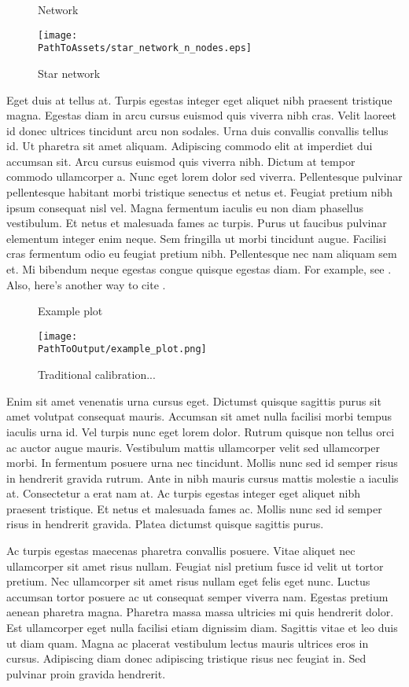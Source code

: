 \begin{figure}
\centering
\captionsetup{width=0.8\textwidth}
\caption{Network}
  \centering
  \texttt{[image: \\PathToAssets/star\_network\_n\_nodes.eps]}
\caption*{
  Star network
  }
\label{fig:star_network_n_nodes.eps}
\end{figure}


Eget duis at tellus at. Turpis egestas integer eget aliquet nibh praesent
tristique magna. Egestas diam in arcu cursus euismod quis viverra nibh cras.
Velit laoreet id donec ultrices tincidunt arcu non sodales. Urna duis
convallis convallis tellus id. Ut pharetra sit amet aliquam. Adipiscing
commodo elit at imperdiet dui accumsan sit. Arcu cursus euismod quis viverra
nibh. Dictum at tempor commodo ullamcorper a. Nunc eget lorem dolor sed
viverra. Pellentesque pulvinar pellentesque habitant morbi tristique senectus
et netus et. Feugiat pretium nibh ipsum consequat nisl vel. Magna fermentum
iaculis eu non diam phasellus vestibulum. Et netus et malesuada fames ac
turpis. Purus ut faucibus pulvinar elementum integer enim neque. Sem
fringilla ut morbi tincidunt augue. Facilisi cras fermentum odio eu feugiat
pretium nibh. Pellentesque nec nam aliquam sem et. Mi bibendum neque egestas
congue quisque egestas diam. For example, see \citet{fama1992cross}. Also, here's another
way to cite \citep{sharpe1964capital}.

\begin{figure}
\centering
\caption{Example plot}
  \centering
  \texttt{[image: \\PathToOutput/example\_plot.png]}
\caption*{
  Traditional calibration...
  }
\label{fig:div-futures-habits-comparison}
\end{figure}

Enim sit amet venenatis urna cursus eget. Dictumst quisque sagittis purus sit
amet volutpat consequat mauris. Accumsan sit amet nulla facilisi morbi tempus
iaculis urna id. Vel turpis nunc eget lorem dolor. Rutrum quisque non tellus
orci ac auctor augue mauris. Vestibulum mattis ullamcorper velit sed
ullamcorper morbi. In fermentum posuere urna nec tincidunt. Mollis nunc sed
id semper risus in hendrerit gravida rutrum. Ante in nibh mauris cursus
mattis molestie a iaculis at. Consectetur a erat nam at. Ac turpis egestas
integer eget aliquet nibh praesent tristique. Et netus et malesuada fames ac.
Mollis nunc sed id semper risus in hendrerit gravida. Platea dictumst quisque
sagittis purus.

Ac turpis egestas maecenas pharetra convallis posuere. Vitae aliquet nec
ullamcorper sit amet risus nullam. Feugiat nisl pretium fusce id velit ut
tortor pretium. Nec ullamcorper sit amet risus nullam eget felis eget nunc.
Luctus accumsan tortor posuere ac ut consequat semper viverra nam. Egestas
pretium aenean pharetra magna. Pharetra massa massa ultricies mi quis
hendrerit dolor. Est ullamcorper eget nulla facilisi etiam dignissim diam.
Sagittis vitae et leo duis ut diam quam. Magna ac placerat vestibulum lectus
mauris ultrices eros in cursus. Adipiscing diam donec adipiscing tristique
risus nec feugiat in. Sed pulvinar proin gravida hendrerit.

